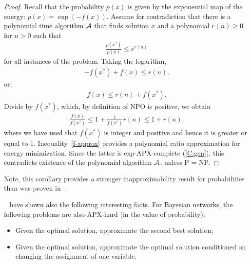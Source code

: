 \begin{proof}
Recall that the probability $p(x)$ is given by the exponential map of the energy: $p(x) = \exp(-f(x))$. Assume for contradiction that there is a polynomial time algorithm $\mathcal{A}$ that finds solution $x$ and a polynomial $r(n) \geq 0$ for $n > 0$ such that
\begin{align}
\frac{p(x^*)}{p(x)} \leq e^{r(n)}
\end{align}
for all instances of the problem.
Taking the logarithm,
\begin{align}
-f(x^*) + f(x) \leq r(n).
\end{align}
or, 
\begin{align}
f(x) \leq r(n) + f(x^*).
\end{align}
Divide by $f(x^*)$, which, by definition of NPO is positive, we obtain
\begin{align}\label{f-approx}
\frac{f(x)}{f(x^*)} \leq 1 + \frac{1}{f(x^*)}r(n) \leq 1 + r(n).
\end{align}
where we have used that $f(x^*)$ is integer and positive and hence it is greater or equal to 1. Inequality~\eqref{f-approx} provides a polynomial ratio approximation for energy minimization. Since the latter is exp-APX-complete (\cref{C:gen}), this contradicts existence of the polynomial algorithm $\mathcal{A}$, unless P = NP.
\end{proof}

Note, this corollary provides a stronger inapproximability result for probabilities than was proven in~\cite{Abdelbar-98}.

\begin{remark}~\citet{Abdelbar-98} have shown also the following interesting facts. For Bayesian networks, the following problems are also APX-hard (in the value of probability):
\begin{itemize}
\item Given the optimal solution, approximate the second best solution;
\item Given the optimal solution, approximate the optimal solution conditioned on changing the assignment of one variable.
\end{itemize}
\end{remark}


